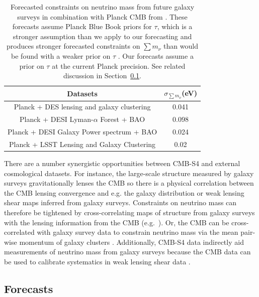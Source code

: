 \begin{table}[t!]
\begin{center}
\begin{tabular}{|c|c|} 
\hline
    				  Datasets 			& $\sigma_{\sum m_\nu}$(eV) \\
				  \hline
Planck + DES lensing and galaxy clustering 		& 			0.041		\\
\hline
Planck + DESI Lyman-$\alpha$ Forest + BAO           &			0.098		\\
\hline
Planck + DESI Galaxy Power spectrum + BAO         &			0.024		\\
\hline
Planck + LSST Lensing and Galaxy Clustering         &   0.02					\\
\hline
\end{tabular}
\caption{Forecasted constraints on neutrino mass from future galaxy surveys in combination with Planck CMB from \cite{Font-Ribera:2013rwa}.  These forecasts assume Planck Blue Book priors for $\tau$, which is a stronger assumption than we apply to our forecasting and produces stronger forecasted constraints on $\sum m_\nu$ than would be found with a weaker prior on $\tau$ . Our forecasts assume a prior on $\tau$ at the current Planck precision. See related discussion in Section~\ref{sec:nuforecasts}. }
\label{table:numassLSS}
\end{center}
\end{table}

There are a number synergistic opportunities between CMB-S4 and external cosmological datasets. For instance, the large-scale structure measured by galaxy surveys gravitationally lenses the CMB so there is a physical correlation between the CMB lensing convergence and e.g. the galaxy distribution or weak lensing shear maps inferred from galaxy surveys. Constraints on neutrino mass can therefore be tightened by cross-correlating maps of structure from galaxy surveys with the lensing information from the CMB (e.g.\ \cite{Takeuchi:2013gpa, Pearson:2013iha}). Or, the CMB can be cross-correlated with galaxy survey data to constrain neutrino mass via the mean pair-wise momentum of galaxy clusters \cite{Mueller:2014dba}. Additionally, CMB-S4 data indirectly aid measurements of neutrino mass from galaxy surveys because the CMB data can be used to calibrate systematics in weak lensing shear data \cite{Das:2013aia}. 





\subsection{Forecasts}\label{sec:nuforecasts}



